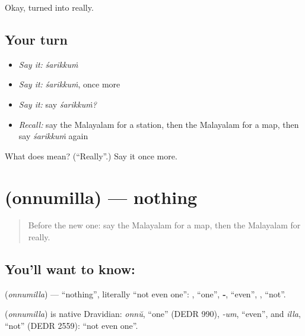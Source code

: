 \begin{grammarlens}[title={What you've built}]
Okay, turned into really.
\end{grammarlens}

\subsection*{Your turn}
\begin{itemize}
\raggedright
  \item \emph{Say it:} \emph{śarikkuṁ}
  \item \emph{Say it:} \emph{śarikkuṁ}, once more
  \item \emph{Say it:} say \emph{śarikkuṁ?}
  \item \emph{Recall:} say the Malayalam for a station, then the Malayalam for a map, then say \emph{śarikkuṁ} again
\end{itemize}

\begin{tcolorbox}[breakable,colback=teal!4,colframe=teal!35!black,title={Before you move on}]
What does  mean? (\textquotedblleft{}Really\textquotedblright{}.) Say it once more.
\end{tcolorbox}
\section[\texorpdfstring{\ml{ഒന്നുമില്ല} (onnumilla)}{ഒന്നുമില്ല (onnumilla)}]{ (onnumilla) — nothing}

\label{lesson:ML-C122-nothing}



\begin{quote}
Before the new one: say the Malayalam for a map, then the Malayalam for really.
\end{quote}

\subsection*{You'll want to know: }
\textbf{} (\emph{onnumilla}) — \textquotedblleft{}nothing\textquotedblright{}, literally \textquotedblleft{}not even one\textquotedblright{}: \textbf{}, \textquotedblleft{}one\textquotedblright{}, \textbf{‑}, \textquotedblleft{}even\textquotedblright{}, \textbf{}, \textquotedblleft{}not\textquotedblright{}.

\begin{cousinweb}
\textbf{} (\emph{onnumilla}) is native Dravidian: \emph{onnŭ}, \textquotedblleft{}one\textquotedblright{} (DEDR 990), \emph{-um}, \textquotedblleft{}even\textquotedblright{}, and \emph{illa}, \textquotedblleft{}not\textquotedblright{} (DEDR 2559): \textquotedblleft{}not even one\textquotedblright{}.
\end{cousinweb}

